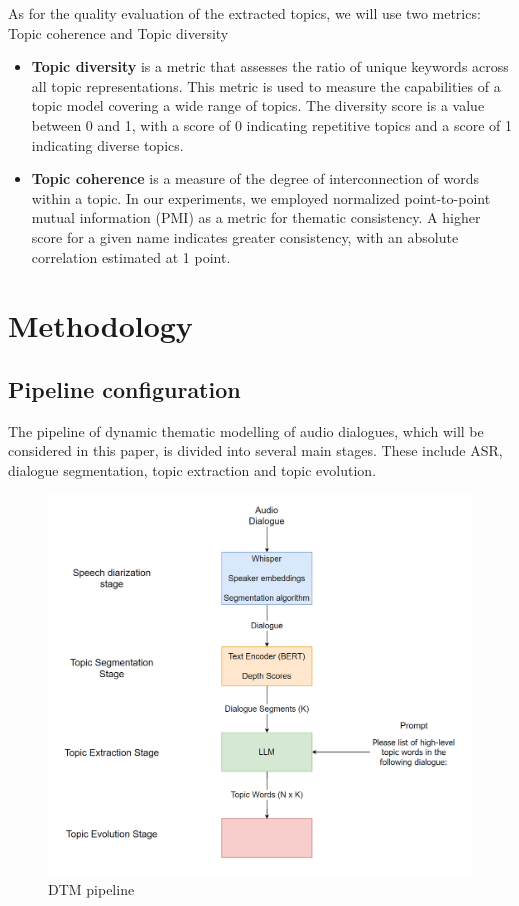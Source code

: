 \documentclass[PMI,VKR]{HSEUniversity}
\begin{document}
As for the quality evaluation of the extracted topics, we will use two metrics: Topic coherence and Topic diversity
\begin{itemize}
    \item \textbf{Topic diversity} \cite{topicdiversity:2019} is a metric that assesses the ratio of unique keywords across all topic representations. This metric is used to measure the capabilities of a topic model covering a wide range of topics. The diversity score is a value between 0 and 1, with a score of 0 indicating repetitive topics and a score of 1 indicating diverse topics.
    \item \textbf{Topic coherence} \cite{topiccoh:2009} is a measure of the degree of interconnection of words within a topic. In our experiments, we employed normalized point-to-point mutual information (PMI) as a metric for thematic consistency. A higher score for a given name indicates greater consistency, with an absolute correlation estimated at 1 point.
\end{itemize}


\chapter{Methodology}

\section{Pipeline configuration}

The pipeline of dynamic thematic modelling of audio dialogues, which will be considered in this paper, is divided into several main stages. 
These include ASR, dialogue segmentation, topic extraction and topic evolution. 

\begin{figure}[h]
    \centering
    \includegraphics[scale=0.7]{img/pipeline.png}
    \caption{DTM pipeline}
\end{figure}
\end{document}
